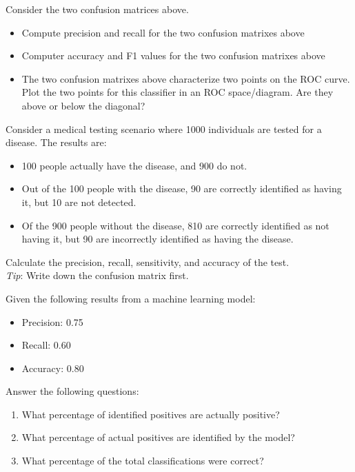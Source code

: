 \begin{exercisebox}
Consider the two confusion matrices above. 
  \begin{itemize}
     \item Compute precision and recall for the two confusion matrixes above
     \item Computer accuracy and F1 values for the two confusion matrixes above
     \item The two confusion matrixes above characterize two points on the ROC curve. Plot the two points for this classifier in an ROC space/diagram. Are they above or below the diagonal?
  \end{itemize}
\end{exercisebox}

\begin{exercisebox}
Consider a medical testing scenario where 1000 individuals are tested for a disease. The results are:
  \begin{itemize}
    \item 100 people actually have the disease, and 900 do not.
    \item Out of the 100 people with the disease, 90 are correctly identified as having it, but 10 are not detected.
    \item Of the 900 people without the disease, 810 are correctly identified as not having it, but 90 are incorrectly identified as having the disease.
  \end{itemize}
  Calculate the precision, recall, sensitivity, and accuracy of the test. \\
  \emph{Tip}: Write down the confusion matrix first.
\end{exercisebox}

\begin{exercisebox}
Given the following results from a machine learning model:
  \begin{itemize}
    \item Precision: 0.75
    \item Recall: 0.60
    \item Accuracy: 0.80
  \end{itemize}
Answer the following questions:
  \begin{enumerate}
    \item What percentage of identified positives are actually positive?
    \item What percentage of actual positives are identified by the model?
    \item What percentage of the total classifications were correct?
  \end{enumerate}
\end{exercisebox}


